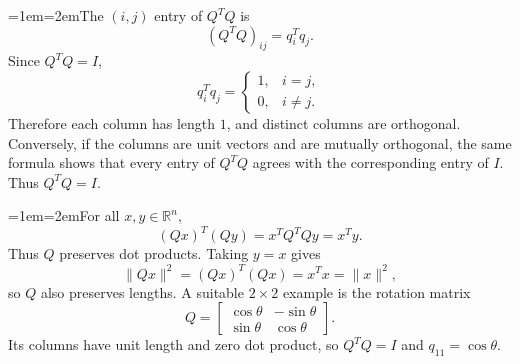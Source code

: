 \documentclass[11pt]{article}
\newcommand{\solutionpart}[1]{\par\smallskip\leftskip=1em\noindent\hangindent=2em\hangafter=1\makebox[1.5em][l]{\textbf{(#1)}}\hspace{0.5em}\ignorespaces}
\begin{document}
\solutionpart{ii}The $(i,j)$ entry of $Q^{T}Q$ is
\[
{(Q^{T}Q)}_{ij}=q_i^{T}q_j.
\]
Since $Q^{T}Q=I$,
\[
q_i^{T}q_j=\begin{cases}
1,&i=j,\\
0,&i\ne j.
\end{cases}
\]
Therefore each column has length $1$, and distinct columns are orthogonal. Conversely, if the columns are unit vectors and are mutually orthogonal, the same formula shows that every entry of $Q^{T}Q$ agrees with the corresponding entry of $I$. Thus $Q^{T}Q=I$.

\solutionpart{iii}For all $x,y\in\mathbb R^n$,
\[
{(Qx)}^{T}(Qy)=x^{T}Q^{T}Qy=x^{T}y.
\]
Thus $Q$ preserves dot products. Taking $y=x$ gives
\[
\|Qx\|^2={(Qx)}^{T}(Qx)=x^{T}x=\|x\|^2,
\]
so $Q$ also preserves lengths. A suitable $2\times2$ example is the rotation matrix
\[
Q=\begin{bmatrix}
\cos\theta&-\sin\theta\\
\sin\theta&\cos\theta
\end{bmatrix}.
\]
Its columns have unit length and zero dot product, so $Q^{T}Q=I$ and $q_{11}=\cos\theta$.
\end{document}
